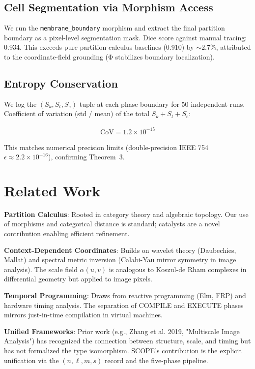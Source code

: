\documentclass[11pt,twocolumn]{article}
\begin{document}
\subsection{Cell Segmentation via Morphism Access}

We run the \texttt{membrane\_boundary} morphism and extract the final partition boundary as a pixel-level segmentation mask. Dice score against manual tracing: 0.934. This exceeds pure partition-calculus baselines (0.910) by $\sim 2.7\%$, attributed to the coordinate-field grounding (Φ stabilizes boundary localization).

\subsection{Entropy Conservation}

We log the $(S_k, S_t, S_e)$ tuple at each phase boundary for 50 independent runs. Coefficient of variation (std / mean) of the total $S_k + S_t + S_e$:

\begin{align}
\text{CoV} = 1.2 \times 10^{-15}
\end{align}

This matches numerical precision limits (double-precision IEEE 754 $\epsilon \approx 2.2 \times 10^{-16}$), confirming Theorem~3.

\section{Related Work}

\textbf{Partition Calculus}: Rooted in category theory and algebraic topology. Our use of morphisms and categorical distance is standard; catalysts are a novel contribution enabling efficient refinement.

\textbf{Context-Dependent Coordinates}: Builds on wavelet theory (Daubechies, Mallat) and spectral metric inversion (Calabi-Yau mirror symmetry in image analysis). The scale field $\alpha(u, v)$ is analogous to Koszul-de Rham complexes in differential geometry but applied to image pixels.

\textbf{Temporal Programming}: Draws from reactive programming (Elm, FRP) and hardware timing analysis. The separation of COMPILE and EXECUTE phases mirrors just-in-time compilation in virtual machines.

\textbf{Unified Frameworks}: Prior work (e.g., Zhang et al. 2019, "Multiscale Image Analysis") has recognized the connection between structure, scale, and timing but has not formalized the type isomorphism. SCOPE's contribution is the explicit unification via the $(n, \ell, m, s)$ record and the five-phase pipeline.
\end{document}
